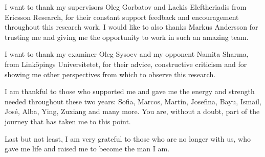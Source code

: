 

I want to thank my supervisors Oleg Gorbatov and Lackis Eleftheriadis from Ericsson Research, for their constant support feedback and encouragement throughout this research work. I would like to also thanks Markus Andersson for trusting me and giving me the opportunity to work in such an amazing team. 

I want to thank my examiner Oleg Sysoev and my opponent Namita Sharma, from Linköpings Universitetet, for their advice, constructive criticism and for showing me other perspectives from which to observe this research. 

I am thankful to those who supported me and gave me the energy and strength needed throughout these two years: Sofia, Marcos, Martín, Josefina, Bayu, Ismail, José, Alba, Ying, Zuxiang and many more. You are, without a doubt, part of the journey that has taken me to this point.

Last but not least, I am very grateful to those who are no longer with us, who gave me life and raised me to become the man I am.


